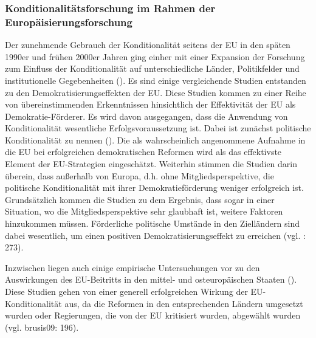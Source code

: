 \subsubsection{Konditionalitätsforschung im Rahmen der Europäisierungsforschung }
Der zunehmende Gebrauch der Konditionalität seitens der EU in den späten 1990er und frühen 2000er Jahren ging einher mit einer Expansion der Forschung zum Einfluss der Konditionalität auf unterschiedliche Länder, Politikfelder und institutionelle Gegebenheiten (\cite{grab99,grab01,grab03, schsed04, schsed05b,schsed05c,vachudova01, vachudova05}). Es sind einige vergleichende Studien entstanden zu den Demokratisierungseffekten der EU. Diese Studien kommen zu einer Reihe von übereinstimmenden Erkenntnissen hinsichtlich der Effektivität der EU als Demokratie-Förderer. Es wird davon ausgegangen, dass die Anwendung von Konditionalität wesentliche Erfolgsvoraussetzung ist. Dabei ist zunächst politische Konditionalität zu nennen (\cite{kelley, kubicek, pridham05,schetal, vachudova05, youngs}). Die als wahrscheinlich angenommene Aufnahme in die EU bei erfolgreichen demokratischen Reformen wird als das effektivste Element der EU-Strategien eingeschätzt. Weiterhin stimmen die Studien darin überein, dass außerhalb von Europa, d.h. ohne Mitgliedsperspektive, die politische Konditionalität mit ihrer Demokratieförderung weniger erfolgreich ist. Grundsätzlich kommen die Studien zu dem Ergebnis, dass sogar in einer Situation, wo die Mitgliedsperspektive sehr glaubhaft ist, weitere Faktoren hinzukommen müssen. Förderliche politische Umstände in den Zielländern sind dabei wesentlich, um einen positiven Demokratisierungseffekt zu erreichen (vgl. \cite{schsch07}: 273).\par
Inzwischen liegen auch einige empirische Untersuchungen vor zu den Auswirkungen des EU-Beitritts in den mittel- und osteuropäischen Staaten (\cite{dimit02, grab05, kneuer07, linden,schsed05a}). Diese Studien gehen von einer generell erfolgreichen Wirkung der EU-Konditionalität aus, da die Reformen in den entsprechenden Ländern umgesetzt wurden oder Regierungen, die von der EU kritisiert wurden, abgewählt wurden (vgl. {brusis09}: 196).\par

